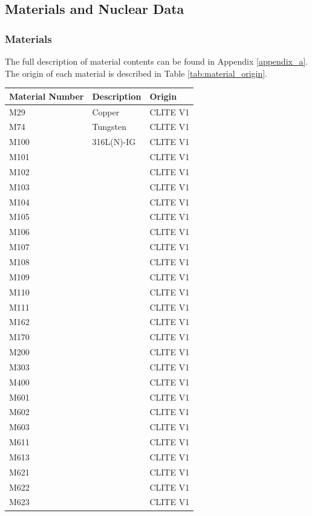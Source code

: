 \documentclass[12pt]{article}
\begin{document}
\subsection{Materials and Nuclear Data}
\subsubsection{Materials}
The full description of material contents can be found in Appendix \ref{appendix_a}. The 
origin of each material is described in Table \ref{tab:material_origin}. 

\begin{centering}
 \begin{longtable}[ht!]{ p{} | p{} | p{} }
  \hline 
  Material Number & Description & Origin \\
  \hline
  M29  & Copper &  CLITE V1 \\
  M74  & Tungsten &  CLITE V1 \\
  M100  & 316L(N)-IG &  CLITE V1 \\
  M101  & &  CLITE V1 \\
  M102  & &  CLITE V1 \\
  M103  & &  CLITE V1 \\
  M104  & &  CLITE V1 \\
  M105  & &  CLITE V1 \\
  M106  & &  CLITE V1 \\
  M107  & &  CLITE V1 \\
  M108  & &  CLITE V1 \\
  M109  & &  CLITE V1 \\
  M110  & &  CLITE V1 \\
  M111  & &  CLITE V1 \\
  M162  & &  CLITE V1 \\
  M170  & &  CLITE V1 \\
  M200  & &  CLITE V1 \\
  M303  & &  CLITE V1 \\
  M400  & &  CLITE V1 \\
  M601  & &  CLITE V1 \\
  M602  & &  CLITE V1 \\
  M603  & &  CLITE V1 \\
  M611  & &  CLITE V1 \\
  M613  & &  CLITE V1 \\
  M621  & &  CLITE V1 \\
  M622  & &  CLITE V1 \\
  M623  & &  CLITE V1 \\

\end{longtable}
\end{centering}
\end{document}
